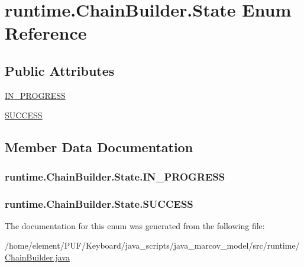 \hypertarget{enumruntime_1_1_chain_builder_1_1_state}{}\section{runtime.\+Chain\+Builder.\+State Enum Reference}
\label{enumruntime_1_1_chain_builder_1_1_state}
\subsection*{Public Attributes}
\begin{DoxyCompactItemize}
\item 
\hyperlink{enumruntime_1_1_chain_builder_1_1_state_a62c8f060cacdb5e4e00cfd49eb589256}{I\+N\+\_\+\+P\+R\+O\+G\+R\+E\+SS}
\item 
\hyperlink{enumruntime_1_1_chain_builder_1_1_state_a4e4251132b0507e126673689e1f01b7a}{S\+U\+C\+C\+E\+SS}
\end{DoxyCompactItemize}


\subsection{Member Data Documentation}
\subsubsection[{\texorpdfstring{I\+N\+\_\+\+P\+R\+O\+G\+R\+E\+SS}{IN_PROGRESS}}]{\setlength{\rightskip}{0pt plus 5cm}runtime.\+Chain\+Builder.\+State.\+I\+N\+\_\+\+P\+R\+O\+G\+R\+E\+SS}\hypertarget{enumruntime_1_1_chain_builder_1_1_state_a62c8f060cacdb5e4e00cfd49eb589256}{}\label{enumruntime_1_1_chain_builder_1_1_state_a62c8f060cacdb5e4e00cfd49eb589256}
\subsubsection[{\texorpdfstring{S\+U\+C\+C\+E\+SS}{SUCCESS}}]{\setlength{\rightskip}{0pt plus 5cm}runtime.\+Chain\+Builder.\+State.\+S\+U\+C\+C\+E\+SS}\hypertarget{enumruntime_1_1_chain_builder_1_1_state_a4e4251132b0507e126673689e1f01b7a}{}\label{enumruntime_1_1_chain_builder_1_1_state_a4e4251132b0507e126673689e1f01b7a}


The documentation for this enum was generated from the following file\+:\begin{DoxyCompactItemize}
\item 
/home/element/\+P\+U\+F/\+Keyboard/java\+\_\+scripts/java\+\_\+marcov\+\_\+model/src/runtime/\hyperlink{_chain_builder_8java}{Chain\+Builder.\+java}\end{DoxyCompactItemize}
